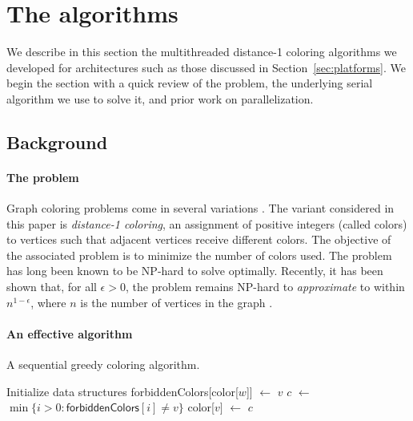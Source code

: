 \documentclass{article}
\begin{document}
\section {The algorithms}
\label{sec:algorithms}

We describe in this section the multithreaded distance-1 coloring algorithms  
we developed for architectures such as those discussed in Section~\ref{sec:platforms}. 
We begin the section with a quick review of the problem, 
the underlying serial algorithm we use to solve it, and prior work on parallelization. 

\subsection{Background}
\label{sec:problem}

\paragraph{The problem}
Graph coloring problems come in several variations \cite{GMP05}.
The variant considered in this paper is {\em distance-1 coloring}, an assignment of  
positive integers (called colors)  to vertices such that  adjacent vertices 
receive different colors.
The objective of the associated  problem is to minimize the number of colors used.
The problem has long been known to be NP-hard to solve optimally.
Recently, it has been shown that, for all $\epsilon > 0$, 
the problem remains NP-hard to {\em approximate} to within $n^{1-\epsilon}$,
where $n$ is the number of vertices in the graph \cite{Zuckerman}.  

\paragraph{An effective algorithm}
\label{sec:sequential}

\begin{algorithm}[t]
\small
\caption{A sequential greedy coloring algorithm.}
\label{algorithm.greedy}
\begin{algorithmic}[1]
  \State Initialize data structures
      \State \textsf{forbiddenColors}[\textsf{color}[$w$]] $\leftarrow$ $v$ \label{l:forbid}
      \EndFor
      \State $c$  $\leftarrow$ $\min\{i>0: \textsf{forbiddenColors}[i] \neq v\}$   \label{l:scolor}  
      \State \textsf{color}[$v]$ $\leftarrow$ $c$ \label{l:assign}
   \EndFor
\EndProcedure
\end{algorithmic}
\end{algorithm}
\end{document}
